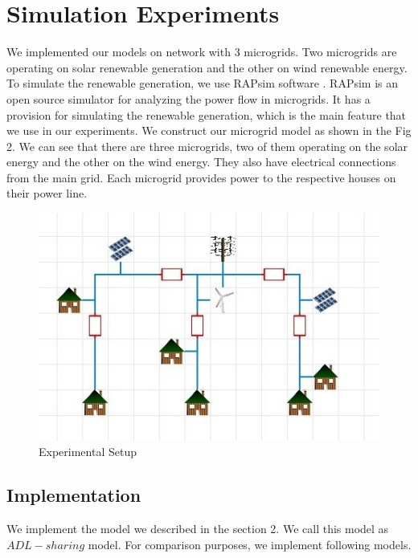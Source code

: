 \section{Simulation Experiments}
We implemented our models on network with 3 microgrids. Two microgrids are operating on solar renewable generation and the other on wind renewable energy. To simulate the renewable generation, we use RAPsim software \cite{rapsim}. RAPsim is an open source simulator for analyzing the power flow in microgrids. It has a provision for simulating the renewable generation, which is the main feature that we use in our experiments. We construct our microgrid model as shown in the Fig 2. We can see that there are three microgrids, two of them operating on the solar energy and the other on the wind energy. They also have electrical connections from the main grid. Each microgrid provides power to the respective houses on their power line. 


\begin{figure}[thbp] \label{exp}
	\centering
	\includegraphics[scale = 0.6]{experimental_setup.jpg}
		\caption{Experimental Setup}
\end{figure}


\subsection{Implementation}

We implement the model we described in the section 2. We call this model as $ADL-sharing$ model. For comparison purposes, we implement following models. 

